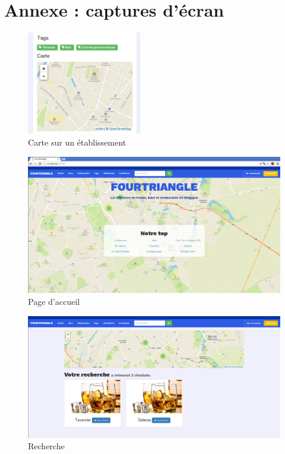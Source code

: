 \documentclass[10pt,a4paper]{article}
\begin{document}
\section{Annexe : captures d'écran}
\begin{center}
\begin{figure}[H]
   \includegraphics[width=5cm]{screen/carte.png}
   \caption{Carte sur un établissement}
\end{figure}


\begin{figure}[H]
   \includegraphics[width=15cm]{screen/home.png}
   \caption{Page d'accueil}
\end{figure}


\begin{figure}[H]
   \includegraphics[width=15cm]{screen/recherche.png}
   \caption{Recherche}
\end{figure}



\end{center}
\end{document}
